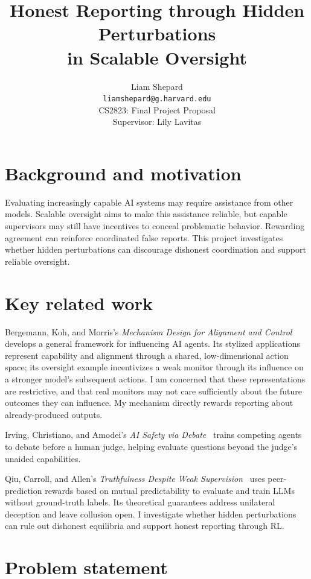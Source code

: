 \documentclass{article}
\title{Honest Reporting through Hidden Perturbations\\in Scalable Oversight}
\author{%
  Liam Shepard \\
  \texttt{liamshepard@g.harvard.edu} \\
  CS2823: Final Project Proposal \\
  Supervisor: Lily Lavitas
}
\begin{document}
\maketitle

\section{Background and motivation}

Evaluating increasingly capable AI systems may require assistance from other models. Scalable oversight aims to make this assistance reliable, but capable supervisors may still have incentives to conceal problematic behavior. Rewarding agreement can reinforce coordinated false reports. This project investigates whether hidden perturbations can discourage dishonest coordination and support reliable oversight.

\section{Key related work}

Bergemann, Koh, and Morris's \emph{Mechanism Design for Alignment and Control}~\cite{bergemann2026} develops a general framework for influencing AI agents. Its stylized applications represent capability and alignment through a shared, low-dimensional action space; its oversight example incentivizes a weak monitor through its influence on a stronger model's subsequent actions. I am concerned that these representations are restrictive, and that real monitors may not care sufficiently about the future outcomes they can influence. My mechanism directly rewards reporting about already-produced outputs.

Irving, Christiano, and Amodei's \emph{AI Safety via Debate}~\cite{irving2018} trains competing agents to debate before a human judge, helping evaluate questions beyond the judge's unaided capabilities.

Qiu, Carroll, and Allen's \emph{Truthfulness Despite Weak Supervision}~\cite{qiu2026} uses peer-prediction rewards based on mutual predictability to evaluate and train LLMs without ground-truth labels. Its theoretical guarantees address unilateral deception and leave collusion open. I investigate whether hidden perturbations can rule out dishonest equilibria and support honest reporting through RL.

\section{Problem statement}
\end{document}
